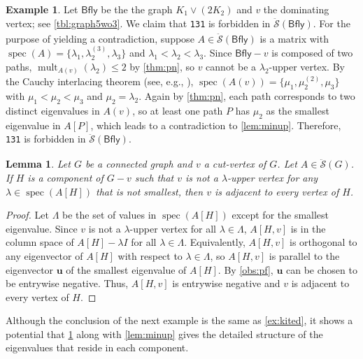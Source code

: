 \documentclass{article}
\newtheorem{lemma}[theorem]{Lemma}
\theoremstyle{definition}
\newtheorem{example}[theorem]{Example}
\newcommand{\dunion}{\mathbin{\dot\cup}}
\newcommand{\bu}{\mathbf{u}}
\newcommand{\spec}{\operatorname{spec}}
\newcommand{\mdso}{\ddot{\mathcal{S}}}
\newcommand{\Bfly}{\mathsf{Bfly}}
\newcommand{\mtt}[2][]{\texttt{#2}\textsubscript{#1}}
\newcommand{\mult}{\operatorname{mult}}
\begin{document}
\begin{example}
\label{ex:bfly}
Let $\Bfly$ be the the graph $K_1\vee(2K_2)$ and $v$ the dominating vertex; see \cref{tbl:graph5wo3}.  We claim that \mtt{131} is forbidden in $\mdso(\Bfly)$.  For the purpose of yielding a contradiction, suppose $A\in\mdso(\Bfly)$ is a matrix with $\spec(A) = \{\lambda_1, \lambda_2^{(3)}, \lambda_3\}$ and $\lambda_1 < \lambda_2 < \lambda_3$.  Since $\Bfly - v$ is composed of two paths, $\mult_{A(v)}(\lambda_2) \leq 2$ by \cref{thm:pn}, so $v$ cannot be a $\lambda_2$-upper vertex.  By the Cauchy interlacing theorem (see, e.g., \cite{BHSoG12}), $\spec(A(v)) = \{\mu_1, \mu_2^{(2)}, \mu_3\}$ with $\mu_1 < \mu_2 < \mu_3$ and $\mu_2 = \lambda_2$. 
Again by \cref{thm:pn}, each path corresponds to two distinct eigenvalues in $A(v)$, so at least one path $P$ has $\mu_2$ as the smallest eigenvalue in $A[P]$, which leads to a contradiction to \cref{lem:minup}.  Therefore, \mtt{131} is forbidden in $\mdso(\Bfly)$.   
\end{example}

\begin{lemma}
\label{lem:fulljoin}
Let $G$ be a connected graph and $v$ a cut-vertex of $G$.  Let $A\in\mdso(G)$.  If $H$ is a component of $G - v$ such that $v$ is not a $\lambda$-upper vertex 
for any $\lambda\in\spec(A[H])$ that is not smallest, then $v$ is adjacent to every vertex of $H$.
\end{lemma}
\begin{proof}
Let $\Lambda$ be the set of values in $\spec(A[H])$ except for the smallest eigenvalue.   Since $v$ is not a $\lambda$-upper vertex for all $\lambda\in\Lambda$, $A[H,v]$ is in the column space of $A[H] - \lambda I$ for all $\lambda\in\Lambda$.  Equivalently, $A[H,v]$ is orthogonal to any eigenvector of $A[H]$ with respect to $\lambda\in\Lambda$, so $A[H,v]$ is parallel to the eigenvector $\bu$ of the smallest eigenvalue of $A[H]$.  By \cref{obs:pf}, $\bu$ can be chosen to be entrywise negative.  Thus, $A[H,v]$ is entrywise negative and $v$ is adjacent to every vertex of $H$.  
\end{proof}

Although the conclusion of the next example is the same as \cref{ex:kited}, it shows a potential that \cref{lem:fulljoin} along with \cref{lem:minup} gives the detailed structure of the eigenvalues that reside in each component. 
\end{document}
